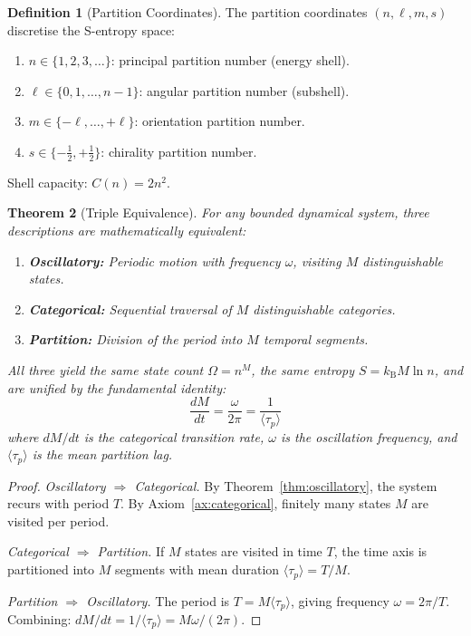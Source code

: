 \documentclass[twocolumn,10pt,a4paper]{article}
\theoremstyle{plain}
\newtheorem{theorem}{Theorem}[section]
\theoremstyle{definition}
\newtheorem{definition}[theorem]{Definition}
\theoremstyle{remark}
\newcommand{\kB}{k_{\mathrm{B}}}
\newcommand{\taup}{\tau_p}
\begin{document}
\begin{definition}[Partition Coordinates]
\label{def:partition_coords}
The partition coordinates $(n, \ell, m, s)$ discretise the S-entropy space:
\begin{enumerate}[label=(\roman*)]
    \item $n \in \{1, 2, 3, \ldots\}$: principal partition number (energy shell).
    \item $\ell \in \{0, 1, \ldots, n-1\}$: angular partition number (subshell).
    \item $m \in \{-\ell, \ldots, +\ell\}$: orientation partition number.
    \item $s \in \{-\tfrac{1}{2}, +\tfrac{1}{2}\}$: chirality partition number.
\end{enumerate}
Shell capacity: $C(n) = 2n^2$.
\end{definition}

\begin{theorem}[Triple Equivalence]
\label{thm:triple}
For any bounded dynamical system, three descriptions are mathematically equivalent:
\begin{enumerate}
    \item \textbf{Oscillatory:} Periodic motion with frequency $\omega$, visiting $M$ distinguishable states.
    \item \textbf{Categorical:} Sequential traversal of $M$ distinguishable categories.
    \item \textbf{Partition:} Division of the period into $M$ temporal segments.
\end{enumerate}
All three yield the same state count $\Omega = n^M$, the same entropy $S = \kB M \ln n$, and are unified by the fundamental identity:
\begin{equation}
\label{eq:fundamental}
    \frac{dM}{dt} = \frac{\omega}{2\pi} = \frac{1}{\langle\taup\rangle}
\end{equation}
where $dM/dt$ is the categorical transition rate, $\omega$ is the oscillation frequency, and $\langle\taup\rangle$ is the mean partition lag.
\end{theorem}

\begin{proof}
\emph{Oscillatory $\Rightarrow$ Categorical.} By Theorem~\ref{thm:oscillatory}, the system recurs with period $T$. By Axiom~\ref{ax:categorical}, finitely many states $M$ are visited per period.

\emph{Categorical $\Rightarrow$ Partition.} If $M$ states are visited in time $T$, the time axis is partitioned into $M$ segments with mean duration $\langle\taup\rangle = T/M$.

\emph{Partition $\Rightarrow$ Oscillatory.} The period is $T = M\langle\taup\rangle$, giving frequency $\omega = 2\pi/T$. Combining: $dM/dt = 1/\langle\taup\rangle = M\omega/(2\pi)$.
\end{proof}
\end{document}

